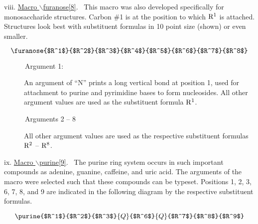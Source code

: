  \vspace{\len mm}
 \indent viii. \underline{Macro $\backslash $furanose[8]}.
 \ This macro was also developed specifically for
 monosaccharide structures. Carbon \#1 is at the position
 to which ${\rm R^1}$ is attached. Structures look best
 with substituent formulas in 10 point size (shown)
 or even smaller.

 \[ \furanose{$R^1$}{$R^2$}{$R^3$}{$R^4$}{$R^5$}{$R^6$}
             {$R^7$}{$R^8$}     \]

 \begin{description}
 \item[{\rm \ \ \ \ \ \ Argument 1:}] \rhq An argument of ``N''
      prints a long vertical bond at position 1,  
      used for attachment to
      purine and pyrimidine bases to form nucleosides.
      All other argument values are used as the substituent
      formula ${\rm R^1}$.
 \item[{\rm \ \ \ \ \ \ Arguments 2 -- 8}] \rhq  All other 
      argument values are used as the respective substituent
      formulas ${\rm R^2}$ -- ${\rm R^8}$.
 \end{description}
    
 \vspace{\len mm}
 \indent ix. \underline{Macro $\backslash $purine[9]}.
 \ The purine ring system occurs in such important compounds
 as adenine, guanine, caffeine, and uric acid. The arguments
 of the macro were selected such that these compounds can
 be typeset. Positions 1, 2, 3, 6, 7, 8, and 9 are indicated
 in the following diagram by the respective substituent
 formulas.

 \[ \purine{$R^1$}{$R^2$}{$R^3$}{Q}{$R^6$}{Q}{$R^7$}
           {$R^8$}{$R^9$}   \]

